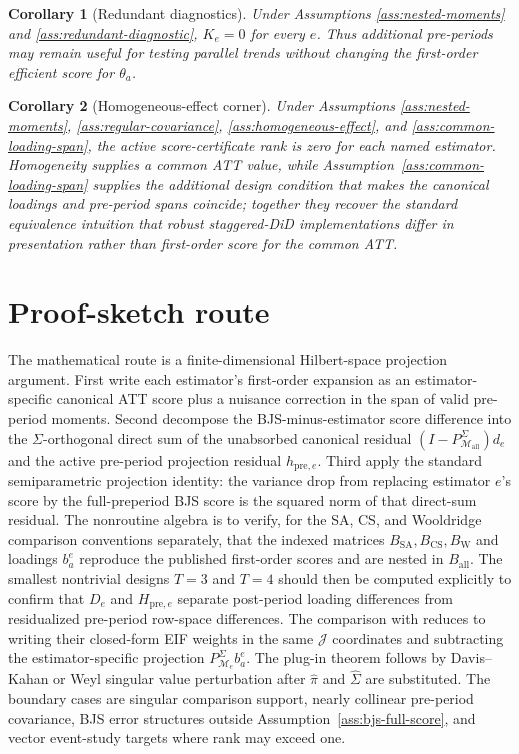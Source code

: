 \documentclass[11pt]{article}
\theoremstyle{definition}
\theoremstyle{plain}
\newtheorem{corollary}{Corollary}
\theoremstyle{remark}
\begin{document}
\begin{corollary}[Redundant diagnostics]\label{cor:redundant-diagnostics}
Under Assumptions \ref{ass:nested-moments} and
\ref{ass:redundant-diagnostic}, \(K_e=0\) for every
\(e\).  Thus additional pre-periods may remain useful for testing parallel
trends without changing the first-order efficient score for \(\theta_a\).
\end{corollary}

\begin{corollary}[Homogeneous-effect corner]\label{cor:homogeneous-corner}
Under Assumptions \ref{ass:nested-moments},
\ref{ass:regular-covariance}, \ref{ass:homogeneous-effect}, and
\ref{ass:common-loading-span}, the active score-certificate rank is zero for
each named estimator.  Homogeneity supplies a common ATT value, while
Assumption~\ref{ass:common-loading-span} supplies the additional design
condition that makes the canonical loadings and pre-period spans coincide;
together they recover the standard equivalence intuition that robust
staggered-DiD implementations differ in presentation rather than first-order
score for the common ATT.
\end{corollary}

\section{Proof-sketch route}
The mathematical route is a finite-dimensional Hilbert-space projection
argument.  First write each estimator's first-order expansion as an
estimator-specific canonical ATT score plus a nuisance correction in the span
of valid pre-period moments.  Second decompose the BJS-minus-estimator score
difference into the \(\Sigma\)-orthogonal direct sum of the unabsorbed
canonical residual \((I-P_{\mathcal M_{\mathrm{all}}}^{\Sigma})d_e\) and the
active pre-period projection residual \(h_{\mathrm{pre},e}\).  Third apply the
standard semiparametric projection identity: the variance drop from replacing
estimator \(e\)'s score by the full-preperiod BJS score is the squared norm of
that direct-sum residual.  The nonroutine algebra is to verify, for the SA,
CS, and Wooldridge comparison conventions separately, that the indexed
matrices \(B_{\mathrm{SA}},B_{\mathrm{CS}},B_{\mathrm{W}}\) and loadings
\(b_a^e\) reproduce the published first-order scores and are nested in
\(B_{\mathrm{all}}\).  The smallest nontrivial designs \(T=3\) and \(T=4\)
should then be computed explicitly to confirm that \(D_e\) and
\(H_{\mathrm{pre},e}\) separate post-period loading differences from
residualized pre-period row-space differences.  The comparison with
\citet{ChenSantAnnaXie2025} reduces to writing their closed-form EIF weights
in the same \(\mathcal J\) coordinates and subtracting the estimator-specific
projection \(P_{\mathcal M_e}^{\Sigma}b_a^e\).  The plug-in theorem follows by
Davis--Kahan or Weyl singular value perturbation after \(\widehat\pi\) and
\(\widehat\Sigma\) are substituted.  The boundary cases are singular
comparison support, nearly collinear pre-period covariance, BJS error
structures outside Assumption~\ref{ass:bjs-full-score}, and vector event-study
targets where rank may exceed one.
\end{document}
